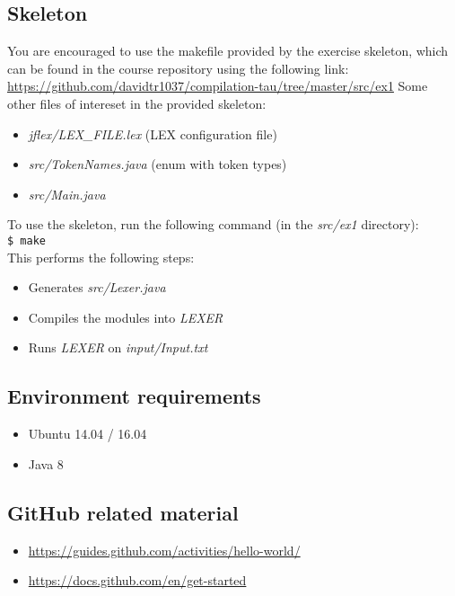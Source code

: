 \documentclass{article}
\begin{document}
\subsection{Skeleton}
You are encouraged to use the makefile provided by the exercise skeleton,
which can be found in the course repository using the following link: \\
\url{https://github.com/davidtr1037/compilation-tau/tree/master/src/ex1}
Some other files of intereset in the provided skeleton:
\begin{itemize}
    \item \textit{jflex/LEX\_FILE.lex} (LEX configuration file)
    \item \textit{src/TokenNames.java} (enum with token types)
    \item \textit{src/Main.java}
\end{itemize}
To use the skeleton, run the following command (in the \textit{src/ex1} directory): \\
\texttt{\$ make} \\
This performs the following steps:
\begin{itemize}
    \item Generates \textit{src/Lexer.java}
    \item Compiles the modules into \textit{LEXER}
    \item Runs \textit{LEXER} on \textit{input/Input.txt}
\end{itemize}

\subsection{Environment requirements}
\begin{itemize}
\item Ubuntu 14.04 / 16.04
\item Java 8
\end{itemize}

\subsection{GitHub related material}
\begin{itemize}
    \item \url{https://guides.github.com/activities/hello-world/}
    \item \url{https://docs.github.com/en/get-started}
\end{itemize}
\end{document}

